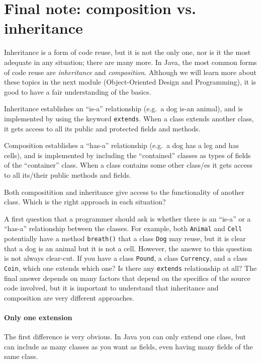 \section{Final note: composition vs. inheritance}
\label{sec:final-note:-comp}

Inheritance is a form of code reuse, but it is not the only one, nor
is it the most adequate in any situation; there are many more. In
Java, the most common forms of code reuse are \emph{inheritance} and
\emph{composition}. Although we will learn more about these topics in
the next module (Object-Oriented Design and Programming), it is good
to have a fair understanding of the basics. 

Inheritance establishes an ``is-a'' relationship (e.g.~a dog is-an 
animal), and is implemented by
using the keyword \verb+extends+. When a class extends another class,
it gets access to all its public and protected fields and methods. 

Composition establishes a ``has-a'' relationship (e.g.~a dog has a leg
and has cells), and is implemented by including the ``contained''
classes as types of fields of the ``container'' class.  When a class
contains some other class/es it gets access to all its/their public methods
and fields. 

Both compositition and inheritance give access to the functionality of
another class. Which is the right approach in each situation? 

A first
question that a programmer should ask is whether there is an ``is-a''
or a ``has-a'' relationship between the classes. For example, both
\verb+Animal+ and \verb+Cell+ potentially have a method
\verb+breath()+ that a class \verb+Dog+ may reuse, but it is clear
that a dog is an animal but it is not a cell. However, the answer to
this question is not
always clear-cut. If you have a class \verb+Pound+, a class
\verb+Currency+, and a class \verb+Coin+, which one extends which one?
Is there any \verb+extends+ relationship at all? The final answer
depends on many factors that depend on the specifics of the source
code involved, but it is important to understand that inheritance and
composition are very different approaches. 

\paragraph{Only one extension}
\label{sec:only-one-extension}

The first difference is very obvious. In Java you can only extend one
class, but can include as many classes as you want as fields, even
having many fields of the same class. 

